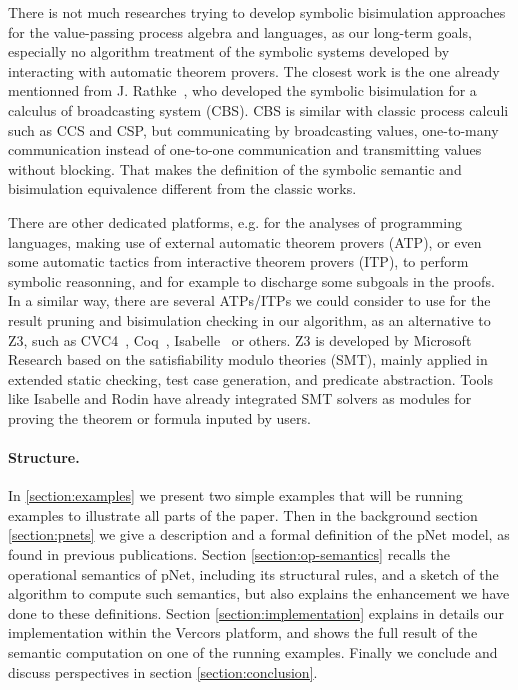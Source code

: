 \documentclass{lncs/llncs}
\newcommand{\TODO}[1]{\textcolor{red}{\textbf{[TODO:#1]}}}
\begin{document}

There is not much researches trying to develop symbolic bisimulation approaches
for the value-passing process algebra and languages, as our long-term goals,
especially no algorithm treatment of the symbolic systems developed by
interacting with automatic theorem provers. The closest work is the
one already mentionned from J. Rathke~\cite{HennessyRathke:TCS98},
who developed the symbolic bisimulation for a
calculus of broadcasting system (CBS). CBS is similar with classic
process calculi such as CCS and CSP, but communicating by broadcasting
values, one-to-many communication instead of one-to-one communication
and transmitting values without blocking. That makes the definition of
the symbolic semantic and bisimulation equivalence different from the
classic works.

There are other dedicated platforms, e.g. for the analyses of 
programming languages, making use of external automatic theorem
provers (ATP), or even some automatic tactics from interactive theorem
provers (ITP), to perform symbolic reasonning, and for example to
discharge some subgoals in the proofs.
In a similar way, there are several ATPs/ITPs we could consider to use for
the result pruning and bisimulation checking in our algorithm, as an
alternative to Z3, such as CVC4~\cite{}, Coq~\cite{},
Isabelle~\cite{} or others. Z3 is
developed by Microsoft Research based on the satisfiability modulo
theories (SMT), mainly applied in extended static checking, test case
generation, and predicate abstraction. Tools like Isabelle and
Rodin have already integrated SMT solvers as modules for proving the
theorem or formula inputed by users. 

\paragraph{Structure.}
In \ref{section:examples} we present two simple examples that will be
running examples to illustrate all parts of the paper. Then in the
background section
\ref{section:pnets} we give a description and a formal definition of
the pNet model, as found in previous publications.
Section \ref{section:op-semantics} recalls the operational semantics
of pNet, including its structural rules, and a sketch of the algorithm
to compute such semantics, but also explains the enhancement we have
done to these definitions.
Section \ref{section:implementation} explains in details our
implementation within the Vercors platform, and shows the full result of
the semantic computation on one of the running examples.
Finally we conclude and discuss perspectives in section
\ref{section:conclusion}. 
\end{document}
